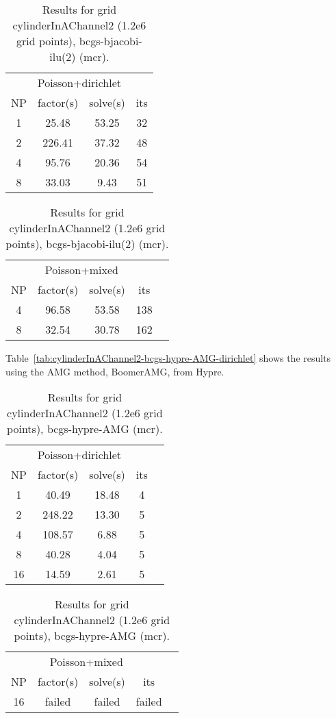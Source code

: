 \begin{table}[hbt]
\begin{center}\footnotesize
\begin{tabular}{|c|c|c|c|} \hline 
\multicolumn{4}{|c|}{Poisson+dirichlet} \\
  NP   & factor(s)  & solve(s) &  its    \\ \hline 
  1   &      25.48  &     53.25 & 32 \\
  2   &     226.41  &     37.32 & 48 \\
  4   &      95.76  &     20.36 & 54 \\
  8   &      33.03  &      9.43 & 51 \\
\hline
\end{tabular}		
\qquad
\begin{tabular}{|c|c|c|c|l|} \hline 
\multicolumn{4}{|c|}{Poisson+mixed} \\
  NP   & factor(s)  & solve(s) &  its    \\ \hline
  4   &      96.58  &     53.58 & 138 \\
  8   &      32.54  &     30.78 & 162 \\
\hline
\end{tabular}
\end{center}		
\caption{Results for grid cylinderInAChannel2 (1.2e6 grid points), bcgs-bjacobi-ilu(2) (mcr).}
 \label{tab:cylinderInAChannel2.bcgs.bjacobi.preonly.ilu2} 
\end{table}



Table~\ref{tab:cylinderInAChannel2-bcgs-hypre-AMG-dirichlet}
shows the results using the AMG method, BoomerAMG, from Hypre.

\begin{table}[hbt]
\begin{center}\footnotesize
\begin{tabular}{|c|c|c|c|l|} \hline 
\multicolumn{4}{|c|}{Poisson+dirichlet} \\
  NP   & factor(s)  & solve(s) &  its    \\\hline 
  1   &      40.49  &     18.48 & 4 \\
  2   &     248.22  &     13.30 & 5 \\
  4   &     108.57  &      6.88 & 5 \\
  8   &      40.28  &      4.04 & 5 \\
 16   &      14.59  &      2.61 & 5 \\
\hline
\end{tabular}		
\qquad
\begin{tabular}{|c|c|c|c|l|} \hline 
\multicolumn{4}{|c|}{Poisson+mixed} \\
  NP   & factor(s)  & solve(s) &  its    \\\hline 
 16   &  failed  &    failed & failed \\
\hline
\end{tabular}		
\end{center}		
\caption{Results for grid cylinderInAChannel2 (1.2e6 grid points), bcgs-hypre-AMG (mcr).}
 \label{tab:cylinderInAChannel2-bcgs-hypre-AMG} 
\end{table}
